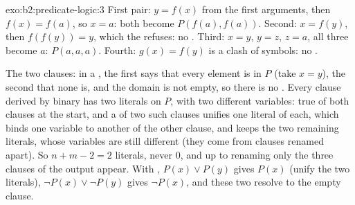 \begin{solution}{exo:b2:predicate-logic:3}
First pair: $y = f(x)$ from the first arguments, then $f(x) = f(a)$, so $x = a$: both become $P(f(a), f(a))$. Second:
$x = f(y)$, then $f(f(y)) = y$, which the  refuses: no . Third: $x = y$, $y = z$, $z = a$, all
three become $a$: $P(a, a, a)$. Fourth: $g(x) = f(y)$ is a clash of symbols: no .


The two clauses: in a , the first says that every element is in $P$ (take $x = y$), the second that none is,
and the domain is not empty, so there is no . Every clause derived by binary  has two literals on $P$, with
two different variables: true of both clauses at the start, and a  of two such clauses unifies one literal
of each, which binds one variable to another of the other clause, and keeps the two remaining literals, whose
variables are still different (they come from clauses renamed apart). So $n + m - 2 = 2$ literals, never 0, and
up to renaming only the three clauses of the output appear. With , $P(x) \vee P(y)$ gives $P(x)$ (unify the two
literals), $\neg P(x) \vee \neg P(y)$ gives $\neg P(x)$, and these two resolve to the empty clause.

\end{solution}

